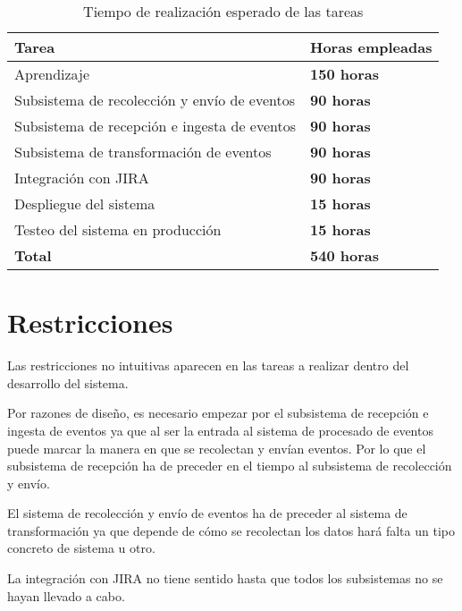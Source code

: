 \begin{table}[H]
	\centering
	\begin{tabular}{|l|l|}
		\hline
		\textbf{Tarea}                               & \textbf{Horas empleadas}                  \\ \hline
		Aprendizaje                                  & \textbf{150 horas}                        \\ \hline
		Subsistema de recolección y envío de eventos & \textbf{90 horas}                         \\ \hline
		Subsistema de recepción e ingesta de eventos & \textbf{90 horas}                         \\ \hline
		Subsistema de transformación de eventos      & \textbf{90 horas}                         \\ \hline
		Integración con JIRA                         & \textbf{90 horas}                         \\ \hline
		Despliegue del sistema                       & \textbf{15 horas}                         \\ \hline
		Testeo del sistema en producción             & \textbf{15 horas}                         \\ \hline
		\textbf{Total}                               & \textbf{540 horas}                        \\ \hline
	\end{tabular}
	\caption{Tiempo de realización esperado de las tareas}
\end{table}

\section{Restricciones}\label{sec:restriccionesini}
Las restricciones no intuitivas aparecen en las tareas a realizar dentro del desarrollo del sistema. 

Por razones de diseño, es necesario empezar por el subsistema de recepción e ingesta de eventos ya que al ser la entrada al sistema de procesado de eventos puede marcar la manera en que se recolectan y envían eventos. Por lo que el subsistema de recepción ha de preceder en el tiempo al subsistema de recolección y envío.

El sistema de recolección y envío de eventos ha de preceder al sistema de transformación ya que depende de cómo se recolectan los datos hará falta un tipo concreto de sistema u otro.

La integración con JIRA no tiene sentido hasta que todos los subsistemas no se hayan llevado a cabo.

